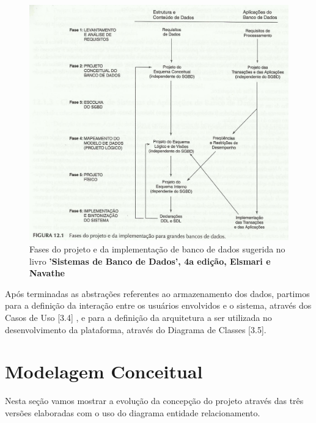 \documentclass[graduacao,brazil]{ThesisPUC}
\begin{document}
\begin{figure}[H]
    \centering
    \includegraphics[width=\linewidth]{Imagens/fases_projeto_banco_dados.jpg}
    \caption{Fases do projeto e da implementação de banco de dados sugerida no livro 
	     \textbf{'Sistemas de Banco de Dados', 4a edição, Elsmari e Navathe}}
\end{figure}

Ap\'{o}s terminadas as abstra\c{c}\~{o}es referentes ao armazenamento dos dados, partimos para a
defini\c{c}\~{a}o da intera\c{c}\~{a}o entre os usu\'{a}rios envolvidos e o sistema, atrav\'{e}s dos Casos de Uso [3.4]
\cite{Larman04}, e para a defini\c{c}\~{a}o da arquitetura a ser utilizada no desenvolvimento da plataforma, atrav\'{e}s do
Diagrama de Classes [3.5].


\section{Modelagem Conceitual}

Nesta se\c{c}\~{a}o vamos mostrar a evolu\c{c}\~{a}o da concep\c{c}\~{a}o do projeto atrav\'{e}s das tr\^{e}s vers\~{o}es
elaboradas com o uso do diagrama entidade relacionamento.
\end{document}
